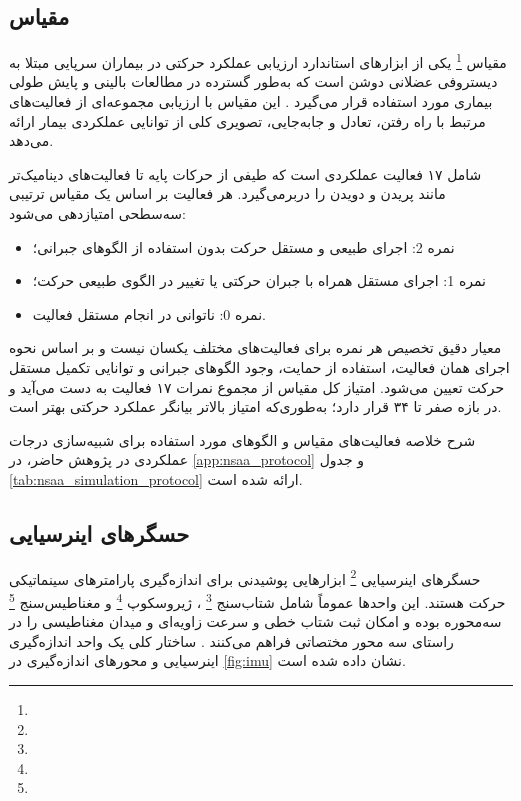 \subsection{مقیاس }

مقیاس
\footnote{}
یکی از ابزارهای استاندارد ارزیابی عملکرد حرکتی در بیماران سرپایی مبتلا به دیستروفی عضلانی دوشن است که به‌طور گسترده در مطالعات بالینی و پایش طولی بیماری مورد استفاده قرار می‌گیرد
\cite{Mazzone2009NSAAReliability,Mayhew2011NSAARasch}.
این مقیاس با ارزیابی مجموعه‌ای از فعالیت‌های مرتبط با راه رفتن، تعادل و جابه‌جایی، تصویری کلی از توانایی عملکردی بیمار ارائه می‌دهد.

 شامل ۱۷ فعالیت عملکردی است که طیفی از حرکات پایه تا فعالیت‌های دینامیک‌تر مانند پریدن و دویدن را دربرمی‌گیرد. هر فعالیت بر اساس یک مقیاس ترتیبی سه‌سطحی امتیازدهی می‌شود:

\begin{itemize}
	\item[$-$] نمره 2: اجرای طبیعی و مستقل حرکت بدون استفاده از الگوهای جبرانی؛
	\item[$-$] نمره 1: اجرای مستقل همراه با جبران حرکتی یا تغییر در الگوی طبیعی حرکت؛
	\item[$-$] نمره 0: ناتوانی در انجام مستقل فعالیت.
\end{itemize}

معیار دقیق تخصیص هر نمره برای فعالیت‌های مختلف یکسان نیست و بر اساس نحوه اجرای همان فعالیت، استفاده از حمایت، وجود الگوهای جبرانی و توانایی تکمیل مستقل حرکت تعیین می‌شود. امتیاز کل مقیاس از مجموع نمرات ۱۷ فعالیت به دست می‌آید و در بازه صفر تا ۳۴ قرار دارد؛ به‌طوری‌که امتیاز بالاتر بیانگر عملکرد حرکتی بهتر است.

شرح خلاصه فعالیت‌های مقیاس  و الگوهای مورد استفاده برای شبیه‌سازی درجات عملکردی در پژوهش حاضر، در 
\autoref{app:nsaa_protocol} 
و جدول
 \ref{tab:nsaa_simulation_protocol} 
ارائه شده است.


\subsection{حسگرهای اینرسیایی}

حسگرهای اینرسیایی 
\footnote{  }
 ابزارهایی پوشیدنی برای اندازه‌گیری پارامترهای سینماتیکی حرکت هستند. این واحدها عموماً شامل شتاب‌سنج
 \footnote{}
  ، ژیروسکوپ
 \footnote{}
 و مغناطیس‌سنج
 \footnote{}
   سه‌محوره بوده و امکان ثبت شتاب خطی و سرعت زاویه‌ای و میدان مغناطیسی را در راستای سه محور مختصاتی فراهم می‌کنند
  \cite{Sabatini2011IMU}.
   ساختار کلی یک واحد اندازه‌گیری اینرسیایی و محورهای اندازه‌گیری در
 \autoref{fig:imu}
     نشان داده شده است.

